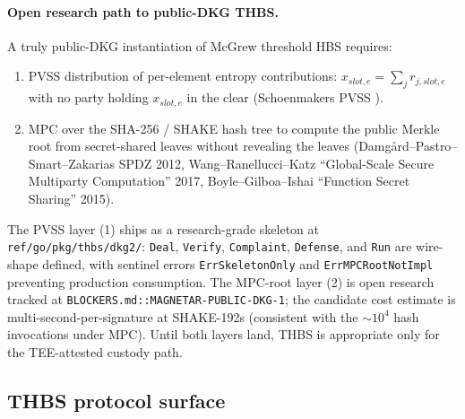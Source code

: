\paragraph{Open research path to public-DKG THBS.} A truly
public-DKG instantiation of McGrew threshold HBS requires:
\begin{enumerate}[leftmargin=2em,nosep]
  \item PVSS distribution of per-element entropy contributions:
        $x_{\mathit{slot}, e} = \sum_j r_{j, \mathit{slot}, e}$
        with no party holding $x_{\mathit{slot}, e}$ in the clear
        (Schoenmakers PVSS \cite{schoenmakers1999}).
  \item MPC over the SHA-256 / SHAKE hash tree to compute the
        public Merkle root from secret-shared leaves without
        revealing the leaves (Damg{\aa}rd--Pastro--Smart--Zakarias
        SPDZ 2012, Wang--Ranellucci--Katz ``Global-Scale Secure
        Multiparty Computation'' 2017, Boyle--Gilboa--Ishai
        ``Function Secret Sharing'' 2015).
\end{enumerate}
The PVSS layer (1) ships as a research-grade skeleton at
\texttt{ref/go/pkg/thbs/dkg2/}: \texttt{Deal}, \texttt{Verify},
\texttt{Complaint}, \texttt{Defense}, and \texttt{Run} are wire-shape
defined, with sentinel errors \texttt{ErrSkeletonOnly} and
\texttt{ErrMPCRootNotImpl} preventing production consumption. The
MPC-root layer (2) is open research tracked at
\texttt{BLOCKERS.md::MAGNETAR-PUBLIC-DKG-1}; the candidate cost
estimate is multi-second-per-signature at SHAKE-192s (consistent
with the $\sim 10^4$ hash invocations under MPC). Until both layers
land, THBS is appropriate only for the TEE-attested custody path.

\subsection{THBS protocol surface}
\label{app:thbs:surface}

